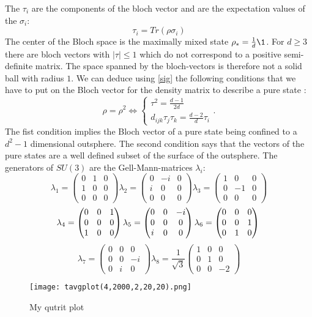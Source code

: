 The $\tau_i$ are the components of the bloch vector and are the expectation values of the $\sigma_i$:
$$
	 \tau_i = Tr(\rho\sigma_i)
$$
The center of the Bloch space is the maximally mixed state $\rho_{*}=\frac{1}{d}\1$.
For $d\ge3$ there are bloch vectors with $\left|\tau\right|\le 1$ which do not correspond to a positive semi-definite matrix.
The space spanned by the bloch-vectors is therefore not a solid ball with radius $1$.
We can deduce using \eqref{sig} the following conditions that we have to put on the Bloch vector for the density matrix to describe a pure state \cite{bengtsson17}:
\[
\rho=\rho^2\Leftrightarrow \begin{cases}
	\tau^2=\frac{d-1}{2d}\\
	d_{ijk}\tau_j\tau_k=\frac{d-2}{d}\tau_i
\end{cases}
.\]
The fist condition implies the Bloch vector of a pure state being confined to a $d^2-1$ dimensional outsphere.
The second condition says that the vectors of the pure states are a well defined subset of the surface of the outsphere.
The generators of  $SU(3)$ are the Gell-Mann-matrices $\lambda_i$: \[
\lambda_1 = \begin{pmatrix} 0 & 1 & 0 \\ 1 & 0 & 0 \\ 0 & 0 & 0 \end{pmatrix}
\lambda_2 = \begin{pmatrix} 0 & -i & 0 \\ i & 0 & 0 \\ 0 & 0 & 0 \end{pmatrix}
\lambda_3 = \begin{pmatrix} 1 & 0 & 0 \\ 0 & -1 & 0 \\ 0 & 0 & 0 \end{pmatrix}
\] \[
\lambda_4 = \begin{pmatrix} 0 & 0 & 1 \\ 0 & 0 & 0 \\ 1 & 0 & 0 \end{pmatrix}
\lambda_5 = \begin{pmatrix} 0 & 0 & -i \\ 0 & 0 & 0 \\ i & 0 & 0 \end{pmatrix}
\lambda_6 = \begin{pmatrix} 0 & 0 & 0 \\ 0 & 0 & 1 \\ 0 & 1 & 0 \end{pmatrix}\\
\]
\[
\lambda_7 = \begin{pmatrix} 0 & 0 & 0 \\ 0 & 0 & -i \\ 0 & i & 0 \end{pmatrix}
\lambda_8 = \frac{1}{\sqrt{3}} \begin{pmatrix} 1 & 0 & 0 \\ 0 & 1 & 0 \\ 0 & 0 & -2 \end{pmatrix}
\]
\begin{figure}[H]
	\centering
	\texttt{[image: tavgplot(4,2000,2,20,20).png]}
	\caption{My qutrit plot}
	\label{fig:4}
\end{figure}

